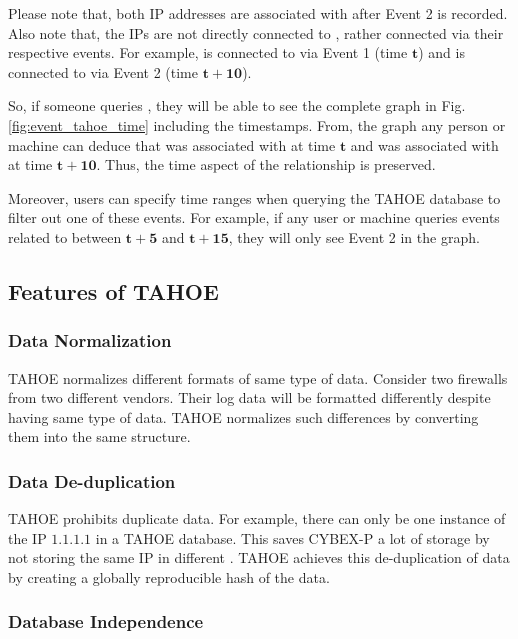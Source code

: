 Please note that, both IP addresses are associated with  after Event 2 is recorded. Also note that, the IPs are not directly connected to , rather connected via their respective events. For example,  is connected to  via Event 1 (time $\mathbf{t}$) and  is connected to  via Event 2 (time $\mathbf{t+10}$).

So, if someone queries , they will be able to see the complete graph in Fig. \ref{fig:event_tahoe_time} including the timestamps. From, the graph any person or machine can deduce that  was associated with  at time $\mathbf{t}$ and was associated with  at time $\mathbf{t+10}$. Thus, the time aspect of the relationship is preserved.

Moreover, users can specify time ranges when querying the TAHOE database to filter out one of these events. For example, if any user or machine queries events related to  between $\mathbf{t+5}$ and $\mathbf{t+15}$, they will only see Event 2 in the graph.



\subsection{Features of TAHOE}


\subsubsection{\textbf{Data Normalization}} TAHOE normalizes different formats of same type of data. Consider two firewalls from two different vendors. Their log data will be formatted differently despite having same type of data. TAHOE normalizes such differences by converting them into the same structure.


\subsubsection{\textbf{Data De-duplication}}\label{sss:dup}

TAHOE prohibits duplicate data. For example, there can only be one instance of the IP $1.1.1.1$ in a TAHOE database. This saves CYBEX-P a lot of storage by not storing the same IP in different . TAHOE achieves this de-duplication of data by creating a globally reproducible hash of the data.


\subsubsection{\textbf{Database Independence}}

